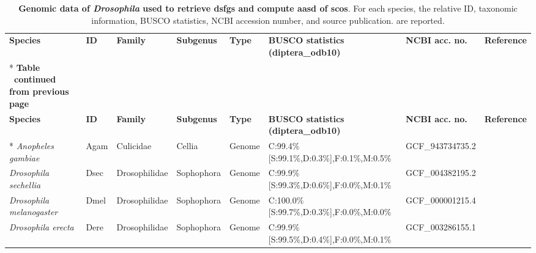 \documentclass[../main.tex]{subfiles}
\begin{document}
\begin{landscape}
	\scriptsize
	\begin{longtable}{llllllll}
		\caption{\textbf{Genomic data of \textit{Drosophila} used to retrieve \glspl{dsfg} and compute \gls{aasd} of \glspl{sco}}. For each species, the relative ID, taxonomic information, BUSCO statistics, NCBI accession number, and source publication. are reported.}
		\label{suppTab:drosophila_dataset}                                                                                                                                                                                          \\
		\toprule
		\textbf{Species}                  & \textbf{ID} & \textbf{Family} & \textbf{Subgenus} & \textbf{Type} & \textbf{BUSCO statistics (diptera\_odb10)}      & \textbf{NCBI acc. no.} & \textbf{Reference}                       \\* \midrule \midrule
		\endfirsthead
		\multicolumn{8}{c}%
		{{\bfseries Table \thetable\ continued from previous page}}                                                                                                                                                                 \\
		\toprule
		\textbf{Species}                  & \textbf{ID} & \textbf{Family} & \textbf{Subgenus} & \textbf{Type} & \textbf{BUSCO statistics (diptera\_odb10)}      & \textbf{NCBI acc. no.} & \textbf{Reference}                       \\* \midrule \midrule
		\endhead
		\textit{Anopheles gambiae}        & Agam        & Culicidae       & Cellia            & Genome        & C:99.4\%{[}S:99.1\%,D:0.3\%{]},F:0.1\%,M:0.5\%  & GCF\_943734735.2       & \textbf{\cite{habtewold2023chromosomal}} \\
		\textit{Drosophila sechellia}     & Dsec        & Drosophilidae   & Sophophora        & Genome        & C:99.9\%{[}S:99.3\%,D:0.6\%{]},F:0.0\%,M:0.1\%  & GCF\_004382195.2       & \textbf{\cite{chakraborty2021evolution}} \\
		\textit{Drosophila melanogaster}  & Dmel        & Drosophilidae   & Sophophora        & Genome        & C:100.0\%{[}S:99.7\%,D:0.3\%{]},F:0.0\%,M:0.0\% & GCF\_000001215.4       & \textbf{\cite{hoskins2015release}}       \\
		\textit{Drosophila erecta}        & Dere        & Drosophilidae   & Sophophora        & Genome        & C:99.9\%{[}S:99.5\%,D:0.4\%{]},F:0.0\%,M:0.1\%  & GCF\_003286155.1       & \textbf{\cite{dong2022new}}              \\

\end{longtable}
\end{landscape}
\end{document}

